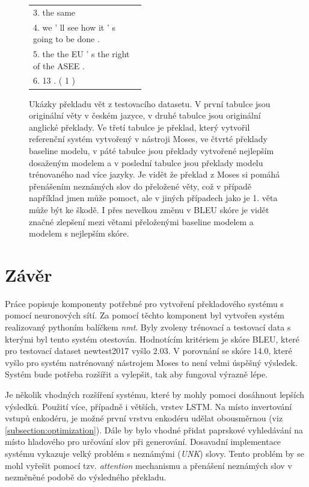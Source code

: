 \begin{figure}[H]
\begin{center}
\begin{tabular}{|p{0.44\linewidth}|}
          3. the same \\
          4. we ' ll see how it ' s going to be done . \\
          5. the the EU ' s the right of the ASEE . \\
          6. 13 . ( 1 ) \\
          \hline
        \end{tabular}        
    \end{center}
	\caption{Ukázky překladu vět z testovacího datasetu. V první tabulce jsou originální věty v českém jazyce, v druhé tabulce jsou originální anglické překlady. Ve třetí tabulce je překlad, který vytvořil referenční systém vytvořený v nástroji Moses, ve čtvrté překlady baseline modelu, v páté tabulce jsou překlady vytvořené nejlepším dosaženým modelem a v poslední tabulce jsou překlady modelu trénovaného nad více jazyky. Je vidět že překlad z Moses si pomáhá přenášením neznámých slov do přeložené věty, což v případě například jmen může pomoct, ale v jiných případech jako je 1. věta může být ke škodě. I přes nevelkou změnu v BLEU skóre je vidět značné zlepšení mezi větami přeloženými baseline modelem a modelem s nejlepším skóre.}
	\label{img:exampleResults}
\end{figure}

\chapter{Závěr}
Práce popisuje komponenty potřebné pro vytvoření překladového systému s pomocí neuronových sítí. Za pomocí těchto komponent byl vytvořen systém realizovaný pythoním balíčkem \emph{nmt}. Byly zvoleny trénovací a testovací data s kterými byl tento systém otestován. Hodnotícím kritériem je skóre BLEU, které pro testovací dataset newtest2017 vyšlo 2.03. V porovnání se skóre 14.0, které vyšlo pro systém natrénovaný nástrojem Moses to není velmi úspěšný výsledek. Systém bude potřeba rozšířit a vylepšit, tak aby fungoval výrazně lépe.

Je několik vhodných rozšíření systému, které by mohly pomoci dosáhnout lepších výsledků. Použití více, případně i větších, vrstev LSTM. Na místo invertování vstupů enkodéru, je možné první vrstvu enkodéru udělat obousměrnou (viz \ref{subsection:optimization}). Dále by bylo vhodné přidat paprskové vyhledávání na místo hladového pro určování slov při generování. Dosavadní implementace systému vykazuje velký problém s neznámými (\emph{UNK}) slovy. Tento problém by se mohl vyřešit pomocí tzv. \emph{attention} mechanismu a přenášení neznámých slov v nezměněné podobě do výsledného překladu.


